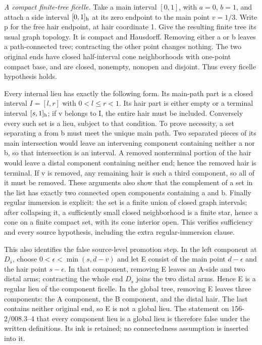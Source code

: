\emph{A compact finite-tree ficelle.}
Take a main interval $[0,1]$, with $a=0$, $b=1$, and attach a side interval $[0,1]_{\rm h}$ at its zero endpoint to the main point $v=1/3$. Write p for the free hair endpoint, at hair coordinate 1. Give the resulting finite tree its usual graph topology. It is compact and Hausdorff. Removing either a or b leaves a path-connected tree; contracting the other point changes nothing. The two original ends have closed half-interval cone neighborhoods with one-point compact base, and are closed, nonempty, nonopen and disjoint. Thus every ficelle hypothesis holds.

Every internal lieu has exactly the following form. Its main-path part is a closed interval $I=[l,r]$ with $0<l\leq r<1$. Its hair part is either empty or a terminal interval $[s,1]_{\rm h}$; if v belongs to I, the entire hair must be included. Conversely every such set is a lieu, subject to that condition. To prove necessity, a set separating a from b must meet the unique main path. Two separated pieces of its main intersection would leave an intervening component containing neither a nor b, so that intersection is an interval. A removed nonterminal portion of the hair would leave a distal component containing neither end; hence the removed hair is terminal. If v is removed, any remaining hair is such a third component, so all of it must be removed. These arguments also show that the complement of a set in the list has exactly two connected open components containing a and b. Finally regular immersion is explicit: the set is a finite union of closed graph intervals; after collapsing it, a sufficiently small closed neighborhood is a finite star, hence a cone on a finite compact set, with its cone interior open. This verifies sufficiency and every source hypothesis, including the extra regular-immersion clause.

This also identifies the false source-level promotion step. In the left component at $D_s$, choose $0<\epsilon<\min(s,d-v)$ and let E consist of the main point $d-\epsilon$ and the hair point $s-\epsilon$. In that component, removing E leaves an A-side and two distal arms; contracting the whole end $D_s$ joins the two distal arms. Hence E is a regular lieu of the component ficelle. In the global tree, removing E leaves three components: the A component, the B component, and the distal hair. The last contains neither original end, so E is not a global lieu. The statement on 156-2/008.3--4 that every component lieu is a global lieu is therefore false under the written definitions. Its ink is retained; no connectedness assumption is inserted into it.

